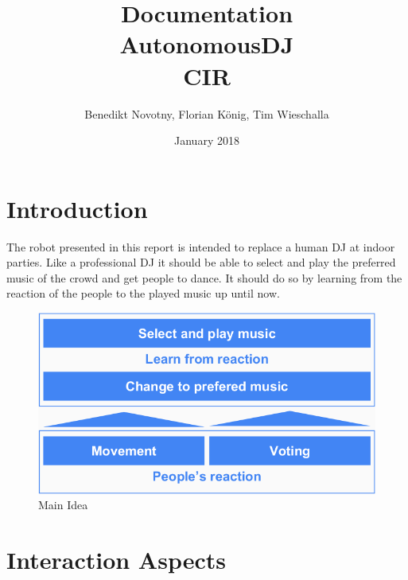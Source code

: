 \documentclass{article}
\title{Documentation \\ \textbf{AutonomousDJ} \\ CIR}
\author{Benedikt Novotny, Florian König, Tim Wieschalla}
\date{January 2018}
\begin{document}
\maketitle

\tableofcontents


\section{Introduction}


The robot presented in this report is intended to replace a human DJ at indoor parties. Like a professional DJ it should be able to select and play the preferred music of the crowd and get people to dance. It should do so by learning from the reaction of the people to the played music up until now.

\begin{figure}[ht!]
\centering
\includegraphics[scale=0.5]{Idea.png}
\caption{Main Idea}
\label{fig:idea}
\end{figure}


\section{Interaction Aspects}


\end{document}
